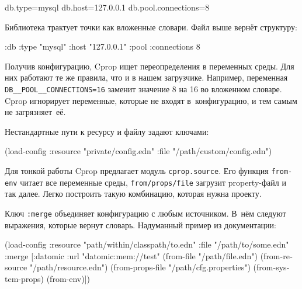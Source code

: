 \begin{english}
  \begin{ini}
db.type=mysql
db.host=127.0.0.1
db.pool.connections=8
  \end{ini}
\end{english}

Библиотека трактует точки как вложенные словари. Файл выше вернёт структуру:

\begin{english}
  \begin{clojure}
{:db {:type "mysql"
      :host "127.0.0.1"
      :pool {:connections 8}}}
  \end{clojure}
\end{english}

Получив конфигурацию, Cprop ищет переопределения в переменных среды. Для них
работают те же правила, что и в нашем загрузчике. Например, переменная
\texttt{DB\_\_POOL\_\_CONNEC\-TIONS=16} заменит значение 8 на 16 во вложенном
словаре. Cprop игнорирует переменные, которые не входят в~конфигурацию, и тем
самым не загрязняет~её.

Нестандартные пути к ресурсу и файлу задают ключами:

\begin{english}
  \begin{clojure}
(load-config
 :resource "private/config.edn"
 :file "/path/custom/config.edn")
  \end{clojure}
\end{english}


Для тонкой работы Cprop предлагает модуль \verb|cprop.source|. Его функция
\verb|from-env| читает все переменные среды, \texttt{from\-/props\-/file}
загрузит property-файл и так далее. Легко построить такую комбинацию, которая
нужна проекту.

Ключ \verb|:merge| объединяет конфигурацию с любым источником. В~нём следуют
выражения, которые вернут словарь. Надуманный пример из документации:

\ifnarrow

\begin{english}
  \begin{clojure}
(load-config
 :resource "path/within/classpath/to.edn"
 :file "/path/to/some.edn"
 :merge
 [{:datomic {:url "datomic:mem://test"}}
  (from-file "/path/file.edn")
  (from-resource "/path/resource.edn")
  (from-props-file "/path/cfg.properties")
  (from-system-props)
  (from-env)])
  \end{clojure}
\end{english}


